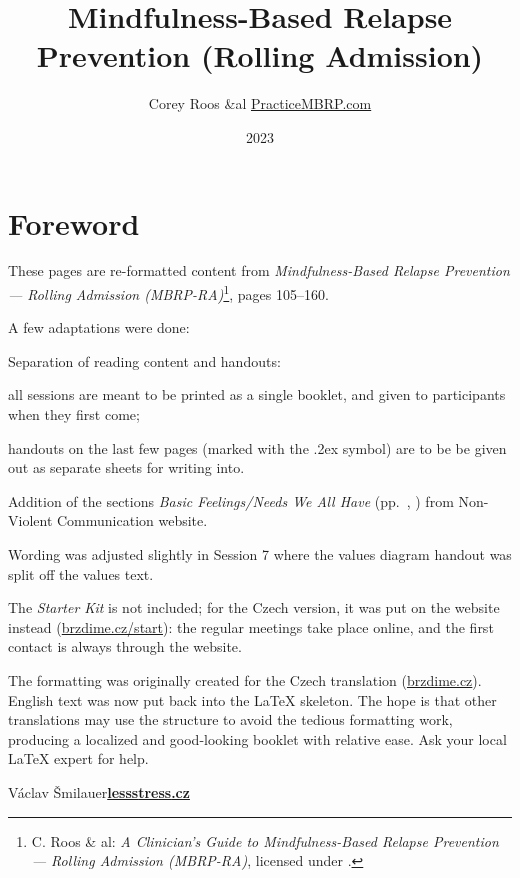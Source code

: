 \documentclass[11pt,a5paper,twoside]{article}
\title{Mindfulness-Based Relapse Prevention (Rolling Admission)}
\date{2023}
\author{Corey Roos \&al \href{https://PracticeMBRP.com}{PracticeMBRP.com}}
\def\lessstressLogo{\href{https://lessstress.cz}{\textsf{\textbf{le\uline{\uline{\uline{s}s}s}tre\uline{\uline{s}s}.cz\uline{\hphantom{s}}}}}}
\def\normalPencilLeftDown{\texorpdfstring{\lower.2ex\hbox{\textmd{\PencilLeftDown}}}{}}
\begin{document}
	\thispagestyle{empty}
	\section*{Foreword}

	\vskip-3mm

	These pages are re-formatted content from \emph{Mindfulness-Based Relapse Prevention — Rolling Admission (MBRP-RA)}\footnote{C. Roos \& al: \emph{A Clinician's Guide to Mindfulness-Based Relapse Prevention — Rolling Admission (MBRP-RA)}, licensed under \doclicenseNameRef.}, pages 105–160.

	A few adaptations were done:
	\begin{itemize*}
		\item Separation of reading content and handouts:
			\begin{itemize*}
				\item all sessions are meant to be printed as a single booklet, and given to participants when they first come;
				\item handouts on the last few pages (marked with the \normalPencilLeftDown{} symbol) are to be be given out as separate sheets for writing into.
			\end{itemize*}
		\item Addition of the sections \emph{Basic Feelings/Needs We All Have} (pp.~\pageref{basic-feelings-we-all-have}, \pageref{basic-needs-we-all-have}) from Non-Violent Communication website.
		\item Wording was adjusted slightly in Session 7 where the values diagram handout was split off the values text.
		\item The \emph{Starter Kit} is not included; for the Czech version, it was put on the website instead (\href{https://brzdime.cz/start/}{brzdime.cz/start}): the regular meetings take place online, and the first contact is always through the website.
	\end{itemize*}

	The formatting was originally created for the Czech translation (\href{https://brzdime.cz}{brzdime.cz}). English text was now put back into the \LaTeX{} skeleton. The hope is that other translations may use the structure to avoid the tedious formatting work, producing a localized and good-looking booklet with relative ease. Ask your local \LaTeX{} expert for help.

	\hfill Václav Šmilauer\linebreak\null\hfill\linebreak\null\hfill\lessstressLogo

	\setlength{\cftbeforesecskip}{1ex}
	\clearpage
	\tableofcontents
	\thispagestyle{empty}

	
	
\end{document}
